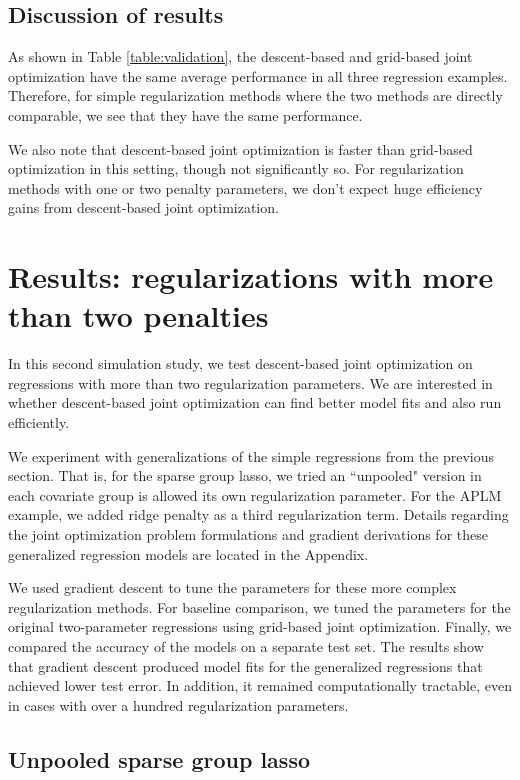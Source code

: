 \documentclass[10pt,letterpaper]{article}
\begin{document}
\subsection{Discussion of results}

As shown in Table \ref{table:validation}, the descent-based and grid-based joint optimization have the same average performance in all three regression examples. Therefore, for simple regularization methods where the two methods are directly comparable, we see that they have the same performance.

We also note that descent-based joint optimization is faster than grid-based optimization in this setting, though not significantly so. For regularization methods with one or two penalty parameters, we don't expect huge efficiency gains from descent-based joint optimization.

\section{Results: regularizations with more than two penalties}

In this second simulation study, we test descent-based joint optimization on regressions with more than two regularization parameters. We are interested in whether descent-based joint optimization can find better model fits and also run efficiently.

We experiment with generalizations of the simple regressions from the previous section. That is, for the sparse group lasso, we tried an ``unpooled" version in each covariate group is allowed its own regularization parameter. For the APLM example, we added ridge penalty as a third regularization term. Details regarding the joint optimization problem formulations and gradient derivations for these generalized regression models are located in the Appendix.

We used gradient descent to tune the parameters for these more complex regularization methods. For baseline comparison, we tuned the parameters for the original two-parameter regressions using grid-based joint optimization. Finally, we compared the accuracy of the models on a separate test set. The results show that gradient descent produced model fits for the generalized regressions that achieved lower test error. In addition, it remained computationally tractable, even in cases with over a hundred regularization parameters.

\subsection{Unpooled sparse group lasso}
\end{document}
